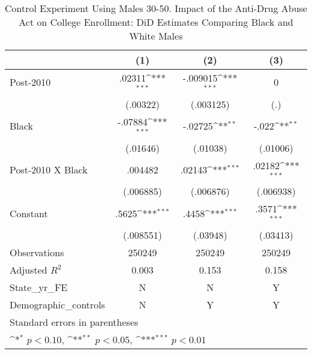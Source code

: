 \begin{table}[htbp]\centering
\def\sym#1{\ifmmode^{#1}\else\(^{#1}\)\fi}
\caption{Control Experiment Using Males 30-50. Impact of the Anti-Drug Abuse Act on College Enrollment: DiD Estimates Comparing Black and White Males}
\begin{tabular}{l*{3}{c}}
\hline\hline
                    &\multicolumn{1}{c}{(1)}         &\multicolumn{1}{c}{(2)}         &\multicolumn{1}{c}{(3)}         \\
\hline
Post-2010           &      .02311\sym{***}&    -.009015\sym{***}&           0         \\
                    &    (.00322)         &   (.003125)         &         (.)         \\
[1em]
Black               &     -.07884\sym{***}&     -.02725\sym{**} &       -.022\sym{**} \\
                    &    (.01646)         &    (.01038)         &    (.01006)         \\
[1em]
Post-2010 X Black   &     .004482         &      .02143\sym{***}&      .02182\sym{***}\\
                    &   (.006885)         &   (.006876)         &   (.006938)         \\
[1em]
Constant            &       .5625\sym{***}&       .4458\sym{***}&       .3571\sym{***}\\
                    &   (.008551)         &    (.03948)         &    (.03413)         \\
\hline
Observations        &      250249         &      250249         &      250249         \\
Adjusted \(R^{2}\)  &       0.003         &       0.153         &       0.158         \\
State\_yr\_FE         &           N         &           N         &           Y         \\
Demographic\_controls&           N         &           Y         &           Y         \\
\hline\hline
\multicolumn{4}{l}{\footnotesize Standard errors in parentheses}\\
\multicolumn{4}{l}{\footnotesize \sym{*} \(p<0.10\), \sym{**} \(p<0.05\), \sym{***} \(p<0.01\)}\\
\end{tabular}
\end{table}
